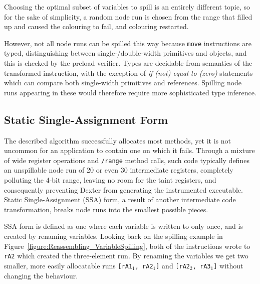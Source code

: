 \documentclass[12pt,twoside,notitlepage]{report}
\begin{document}
Choosing the optimal subset of variables to spill is an entirely different topic, so for the sake of simplicity, a random node run is chosen from the range that filled up and caused the colouring to fail, and colouring restarted.

However, not all node runs can be spilled this way because \texttt{move} instructions are typed, distinguishing between single-/double-width primitives and objects, and this is checked by the preload verifier. Types are decidable from semantics of the transformed instruction, with the exception of \emph{if (not) equal to (zero)} statements which can compare both single-width primitives and references. Spilling node runs appearing in these would therefore require more sophisticated type inference.

\subsection{Static Single-Assignment Form}

The described algorithm successfully allocates most methods, yet it is not uncommon for an application to contain one on which it fails. Through a mixture of wide register operations and \texttt{/range} method calls, such code typically defines an unspillable node run of 20 or even 30 intermediate registers, completely polluting the 4-bit range, leaving no room for the taint registers, and consequently preventing Dexter from generating the instrumented executable. Static Single-Assignment (SSA) form, a result of another intermediate code transformation, breaks node runs into the smallest possible pieces.

SSA form is defined as one where each variable is written to only once, and is created by renaming variables. Looking back on the spilling example in Figure~\ref{figure:Reassembling_VariableSpilling}, both of the instructions wrote to \texttt{rA2} which created the three-element run. By renaming the variables we get two smaller, more easily allocatable runs \texttt{{[}rA1$_1$, rA2$_1$]} and \texttt{{[}rA2$_2$, rA3$_1$]} without changing the behaviour.
\end{document}
